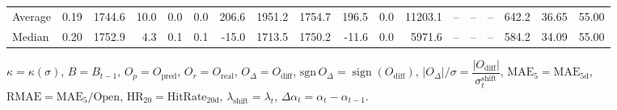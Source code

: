\begin{threeparttable}
{\begin{tabular}{lrrrrrrrrrrrrrrrrr}
Average &     0.19 & 1744.6 &              10.0 &               0.0 &                0.0 &              206.6 & 1951.2 & 1754.7 &      196.5 &                      0.0 &             11203.1 &         -- &        -- &             -- &            642.2 &           36.65 &                  55.00 \\
 Median &     0.20 & 1752.9 &               4.3 &               0.1 &                0.1 &              -15.0 & 1713.5 & 1750.2 &      -11.6 &                      0.0 &              5971.6 &         -- &        -- &             -- &            584.2 &           34.09 &                  55.00 \\
\bottomrule
\end{tabular}
}
\begin{tablenotes}\footnotesize
\item $\kappa=\kappa(\sigma)$, $B=B_{t-1}$, $O_p=O_{\text{pred}}$, $O_r=O_{\text{real}}$, $O_\Delta=O_{\text{diff}}$, $\mathrm{sgn}\,O_\Delta=\operatorname{sign}(O_{\text{diff}})$, $|O_\Delta|/\sigma=\dfrac{|O_{\text{diff}}|}{\sigma_t^{\text{shift}}}$, $\mathrm{MAE}_5=\mathrm{MAE}_{5\text{d}}$, $\mathrm{RMAE}= \mathrm{MAE}_5 / \text{Open}$, $\mathrm{HR}_{20}=\mathrm{HitRate}_{20\text{d}}$, 
$\lambda_{\text{shift}}=\lambda_t$, 
$\Delta\alpha_t=\alpha_t-\alpha_{t-1}$.
\end{tablenotes}
\end{threeparttable}
\endgroup

